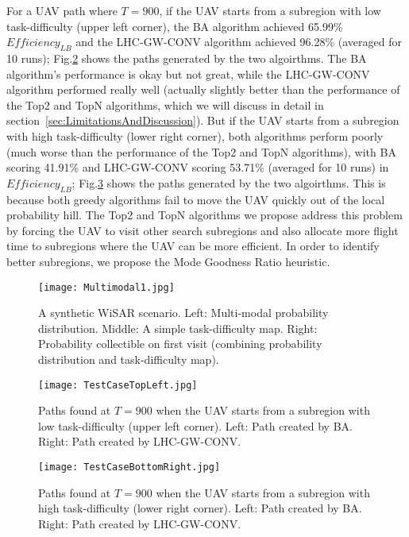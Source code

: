 For a UAV path where $T=900$, if the UAV starts from a subregion with low task-difficulty (upper left corner), the BA algorithm achieved 65.99\% $\mathit{Efficiency_{LB}}$ and the LHC-GW-CONV algorithm achieved 96.28\% (averaged for 10 runs); Fig.\ref{SyntheticCasePaths1} shows the paths generated by the two algoirthms. The BA algorithm's performance is okay but not great, while the LHC-GW-CONV algorithm performed really well (actually slightly better than the performance of the Top2 and TopN algorithms, which we will discuss in detail in section~\ref{sec:LimitationsAndDiscussion}). But if the UAV starts from a subregion with high task-difficulty (lower right corner), both algorithms perform poorly (much worse than the performance of the Top2 and TopN algorithms), with BA scoring 41.91\% and LHC-GW-CONV scoring 53.71\% (averaged for 10 runs) in $\mathit{Efficiency_{LB}}$; Fig.\ref{SyntheticCasePaths2} shows the paths generated by the two algoirthms. This is because both greedy algorithms fail to move the UAV quickly out of the local probability hill. The Top2 and TopN algorithms we propose address this problem by forcing the UAV to visit other search subregions and also allocate more flight time to subregions where the UAV can be more efficient. In order to identify better subregions, we propose the Mode Goodness Ratio heuristic.
\begin{figure}
\centering
\texttt{[image: Multimodal1.jpg]}
\caption[A synthetic WiSAR scenario]{A synthetic WiSAR scenario. Left: Multi-modal probability distribution. Middle: A simple task-difficulty map. Right: Probability collectible on first visit (combining probability distribution and task-difficulty map).}
\label{SyntheticCase}
\end{figure}

\begin{figure}
\centering
\texttt{[image: TestCaseTopLeft.jpg]}
\caption[Paths found when the UAV starts from a subregion with low task-difficulty]{Paths found at $T=900$ when the UAV starts from a subregion with low task-difficulty (upper left corner). Left: Path created by BA. Right: Path created by LHC-GW-CONV.}
\label{SyntheticCasePaths1}
\end{figure}

\begin{figure}
\centering
\texttt{[image: TestCaseBottomRight.jpg]}
\caption[Paths found when the UAV starts from a subregion with high task-difficulty]{Paths found at $T=900$ when the UAV starts from a subregion with high task-difficulty (lower right corner). Left: Path created by BA. Right: Path created by LHC-GW-CONV.}
\label{SyntheticCasePaths2}
\end{figure}

